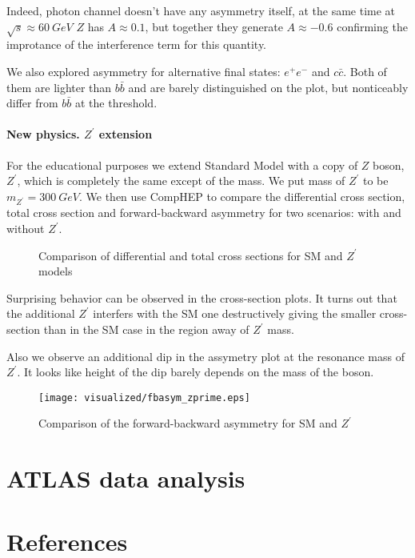 \documentclass{article}
\begin{document}
Indeed, photon channel doesn't have any asymmetry itself, at the same time at $\sqrt{s} \approx 60~GeV$ $Z$ has $A \approx 0.1$, but together they generate $A \approx -0.6$ confirming the improtance of the interference term for this quantity.

We also explored asymmetry for alternative final states: $e^{+} e^{-}$ and $c \bar{c}$. Both of them are lighter than $b \bar{b}$ and are barely distinguished on the plot, but nonticeably differ from $b \bar{b}$ at the threshold.

\paragraph{New physics. $Z^\prime$ extension} For the educational purposes we extend Standard Model with a copy of $Z$ boson, $Z^\prime$, which is completely the same except of the mass. We put mass of $Z^\prime$ to be $m_{Z^\prime} = 300~GeV$. We then use CompHEP to compare the differential cross section, total cross section and forward-backward asymmetry for two scenarios: with and without $Z^\prime$.

\begin{figure}[H]
    \centering
    \hfill%
    \caption{Comparison of differential and total cross sections for SM and $Z^\prime$ models}%
    \label{fig:crsc_zprime}
\end{figure}

Surprising behavior can be observed in the cross-section plots. It turns out that the additional $Z^\prime$ interfers with the SM one destructively giving the smaller cross-section than in the SM case in the region away of $Z^\prime$ mass.

Also we observe an additional dip in the assymetry plot at the resonance mass of $Z^\prime$. It looks like height of the dip barely depends on the mass of the boson.

\begin{figure}[H]
    \centering
    \texttt{[image: visualized/fbasym\_zprime.eps]}
    \caption{Comparison of the forward-backward asymmetry for SM and $Z^\prime$}%
    \label{fig:fbasym_zprime}
\end{figure}

\section{ATLAS data analysis}


\section{References}


\end{document}

